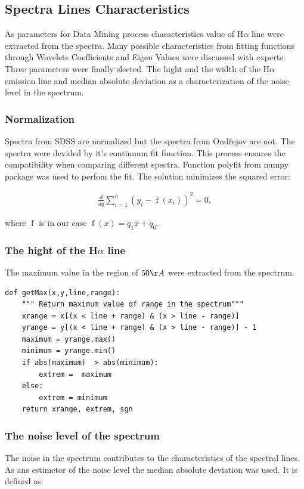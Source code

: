 \subsection{Spectra Lines Characteristics}
As parameters for Data Mining process characteristics value of
H$\alpha$ line were extracted from the spectra. Many possible
characteristics from fitting functions through Wavelets Coefficients
and Eigen Values were discussed with experts. Three parameters were
finally slected. The hight and the width of the H$\alpha$ emission
line and median absolute deviation as a characterization of the noise
level in the spectrum. 


\subsubsection{Normalization}
Spectra from SDSS are normalized but the spectra from Ondřejov are
not. The spectra were devided by it's continuum fit function. This
process ensures the compatibility when comparing different
spectra. Function polyfit from numpy package was used to perfom the
fit. The solution minimizes the squared error:

\begin{align}
  \frac{d}{dq} \sum_{i = 1}^n{(y_i - \operatorname{f}(x_i) )^2} = 0,
\end{align}

where $\operatorname{f}$ is in our case $\operatorname{f}(x) = q_1x +
q_0$.

\subsubsection{The hight of the H$\alpha$ line}
The maximum value in the region of $50\AA$ were extracted from the
spectrum.

\begin{lstlisting}
def getMax(x,y,line,range):
    """ Return maximum value of range in the spectrum"""
    xrange = x[(x < line + range) & (x > line - range)]
    yrange = y[(x < line + range) & (x > line - range)] - 1
    maximum = yrange.max()
    minimum = yrange.min()
    if abs(maximum)  > abs(minimum):
        extrem =  maximum 
    else:
        extrem = minimum 
    return xrange, extrem, sgn
\end{lstlisting}

\subsubsection{The noise level of the spectrum}
The noise in the spectrum contributes to the characteristics of the
spectral lines. As ans estimetor of the noise level the median
absolute deviation was used. It is defined as:

